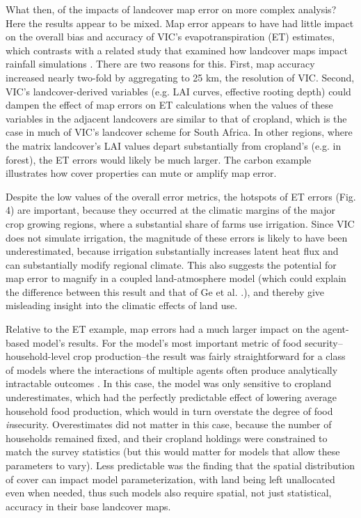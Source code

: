 \documentclass{pnastwo2}
\begin{document}
\begin{article}
What then, of the impacts of landcover map error on more complex analysis?  Here the results appear to be mixed. Map error appears to have had little impact on the overall bias and accuracy of VIC's evapotranspiration (ET) estimates, which contrasts with a related study that examined how landcover maps impact rainfall simulations \cite{ge_impacts_2007}. There are two reasons for this. First, map accuracy increased nearly two-fold by aggregating to 25 km, the resolution of VIC. Second, VIC's landcover-derived variables (e.g. LAI curves, effective rooting depth) could dampen the effect of map errors on ET calculations when the values of these variables in the adjacent landcovers are similar to that of cropland, which is the case in much of VIC's landcover scheme for South Africa. In other regions, where the matrix landcover's LAI values depart substantially from cropland's (e.g. in forest), the ET errors would likely be much larger. The carbon example illustrates how cover properties can mute or amplify map error.  

Despite the low values of the overall error metrics, the hotspots of ET errors (Fig. 4) are important, because they occurred at the climatic margins of the major crop growing regions, where a substantial share of farms use irrigation. Since VIC does not simulate irrigation, the magnitude of these errors is likely to have been underestimated, because irrigation substantially increases latent heat flux and can substantially modify regional climate\cite{sacks_effects_2008,mueller_cooling_2015}. This also suggests the potential for map error to magnify in a coupled land-atmosphere model (which could explain the difference between this result and that of Ge et al. \cite{ge_impacts_2007}.), and thereby give misleading insight into the climatic effects of land use.     

Relative to the ET example, map errors had a much larger impact on the agent-based model's results. For the model's most important metric of food security--household-level crop production--the result was fairly straightforward for a class of models where the interactions of multiple agents often produce analytically intractable outcomes \cite{janssen_empirically_2006}. In this case, the model was only sensitive to cropland underestimates, which had the perfectly predictable effect of lowering average household food production, which would in turn overstate the degree of food \emph{in}security. Overestimates did not matter in this case, because the number of households remained fixed, and their cropland holdings were constrained to match the survey statistics (but this would matter for models that allow these parameters to vary). Less predictable was the finding that the spatial distribution of cover can impact model parameterization, with land being left unallocated even when needed, thus such models also require spatial, not just statistical, accuracy in their base landcover maps.  


\end{article}
\end{document}
